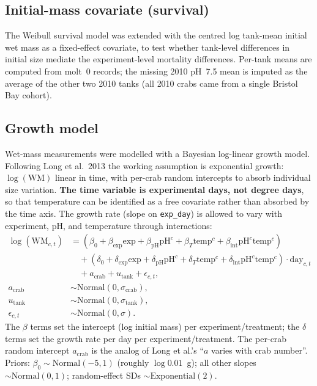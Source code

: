 \documentclass[11pt]{article}
\begin{document}
\subsection{Initial-mass covariate (survival)}
The Weibull survival model was extended with the centred log tank-mean initial wet mass as a fixed-effect covariate, to test whether tank-level differences in initial size mediate the experiment-level mortality differences. Per-tank means are computed from molt~0 records; the missing 2010 pH~7.5 mean is imputed as the average of the other two 2010 tanks (all 2010 crabs came from a single Bristol Bay cohort).

\subsection{Growth model}
\label{sec:growth_model}
Wet-mass measurements were modelled with a Bayesian log-linear growth model. Following Long et al.\ 2013 the working assumption is exponential growth: $\log(\text{WM})$ linear in time, with per-crab random intercepts to absorb individual size variation. \textbf{The time variable is experimental days, not degree days}, so that temperature can be identified as a free covariate rather than absorbed by the time axis. The growth rate (slope on \texttt{exp\_day}) is allowed to vary with experiment, pH, and temperature through interactions:
\begin{align}
\log(\text{WM}_{c,t}) &= (\beta_0 + \beta_{\text{exp}} \text{exp} + \beta_{\text{pH}} \text{pH}^c + \beta_T \text{temp}^c + \beta_{\text{int}}\text{pH}^c \text{temp}^c) \nonumber\\
&\quad + (\delta_0 + \delta_{\text{exp}} \text{exp} + \delta_{\text{pH}} \text{pH}^c + \delta_T \text{temp}^c + \delta_{\text{int}}\text{pH}^c \text{temp}^c) \cdot \text{day}_{c,t} \nonumber\\
&\quad + a_{\text{crab}} + u_{\text{tank}} + \epsilon_{c,t}, \\
a_{\text{crab}} &\sim \text{Normal}(0, \sigma_{\text{crab}}), \\
u_{\text{tank}} &\sim \text{Normal}(0, \sigma_{\text{tank}}), \\
\epsilon_{c,t} &\sim \text{Normal}(0, \sigma).
\end{align}
The $\beta$ terms set the intercept (log initial mass) per experiment/treatment; the $\delta$ terms set the growth rate per day per experiment/treatment. The per-crab random intercept $a_{\text{crab}}$ is the analog of Long et al.'s ``$a$ varies with crab number''. Priors: $\beta_0 \sim \text{Normal}(-5, 1)$ (roughly $\log 0.01$~g); all other slopes $\sim \text{Normal}(0, 1)$; random-effect SDs $\sim \text{Exponential}(2)$.
\end{document}
